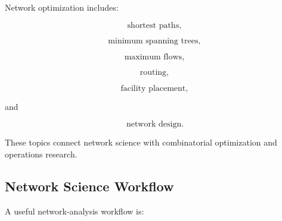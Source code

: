 Network optimization includes:

\[
\boxed{
\text{shortest paths},
}
\]

\[
\boxed{
\text{minimum spanning trees},
}
\]

\[
\boxed{
\text{maximum flows},
}
\]

\[
\boxed{
\text{routing},
}
\]

\[
\boxed{
\text{facility placement},
}
\]

and

\[
\boxed{
\text{network design}.
}
\]

These topics connect network science with combinatorial optimization and
operations research.

\subsection{Network Science Workflow}
\label{subsec:network-science-workflow}

A useful network-analysis workflow is:

